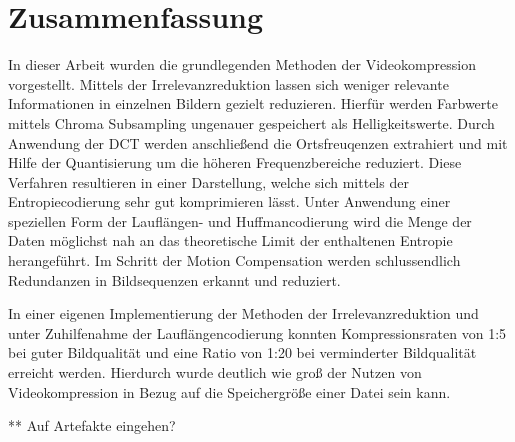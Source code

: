 \chapter{Zusammenfassung}
\label{kap:Zusammenfassung}

In dieser Arbeit wurden die grundlegenden Methoden der Videokompression vorgestellt. Mittels der Irrelevanzreduktion lassen sich weniger relevante Informationen in einzelnen Bildern gezielt reduzieren. Hierfür werden Farbwerte mittels Chroma Subsampling ungenauer gespeichert als Helligkeitswerte. Durch Anwendung der DCT werden anschließend die Ortsfreuqenzen extrahiert und mit Hilfe der Quantisierung um die höheren Frequenzbereiche reduziert. Diese Verfahren resultieren in einer Darstellung, welche sich mittels der Entropiecodierung sehr gut komprimieren lässt. Unter Anwendung einer speziellen Form der Lauflängen- und Huffmancodierung wird die Menge der Daten möglichst nah an das theoretische Limit der enthaltenen Entropie herangeführt. Im Schritt der Motion Compensation werden schlussendlich Redundanzen in Bildsequenzen erkannt und reduziert.

In einer eigenen Implementierung der Methoden der Irrelevanzreduktion und unter Zuhilfenahme der Lauflängencodierung konnten Kompressionsraten von 1:5 bei guter Bildqualität und eine Ratio von 1:20 bei verminderter Bildqualität erreicht werden. Hierdurch wurde deutlich wie groß der Nutzen von Videokompression in Bezug auf die Speichergröße einer Datei sein kann.

** Auf Artefakte eingehen?
